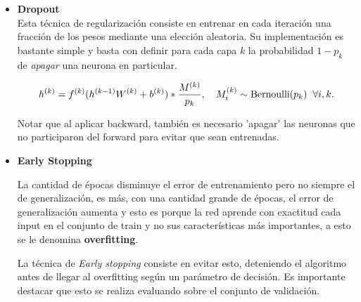 \documentclass[handout, 9pt]{beamer}
\begin{document}
\begin{frame}
\begin{itemize}
  \item \textbf{Dropout} \\ 

  Esta técnica de regularización consiste en entrenar en cada iteración una fracción de los pesos mediante una elección aleatoria. Su implementación es bastante simple y basta con definir para cada capa $k$ la probabilidad $1-p_k$ de \emph{apagar} una neurona en particular. \pause

    \[
    h^{(k)} = f^{(k)}(h^{(k-1)}W^{(k)} + b^{(k)}) *  \frac{M^{(k)}}{p_k}, \quad M^{(k)}_i \sim \text{Bernoulli}(p_k) \hspace{0.2cm} \forall i,k.
    \]

  Notar que al aplicar backward, también es necesario 'apagar' las neuronas que no participaron del forward para evitar que sean entrenadas. \pause

  \item \textbf{Early Stopping} \pause

  La cantidad de épocas disminuye el error de entrenamiento pero no siempre el de generalización, es más, con una cantidad grande de épocas, el error de generalización aumenta y esto es porque la red aprende con exactitud cada input en el conjunto de train y no sus características más importantes, a esto se le denomina \textbf{overfitting}. \\ \pause

  La técnica de \textit{Early stopping} consiste en evitar esto, deteniendo el algoritmo antes de llegar al overfitting según un parámetro de decisión. Es importante destacar que esto se realiza evaluando sobre el conjunto de validación. \pause



\end{itemize}


\end{frame}

\begin{frame}
  \titlepage
\end{frame}






%
\end{document}
